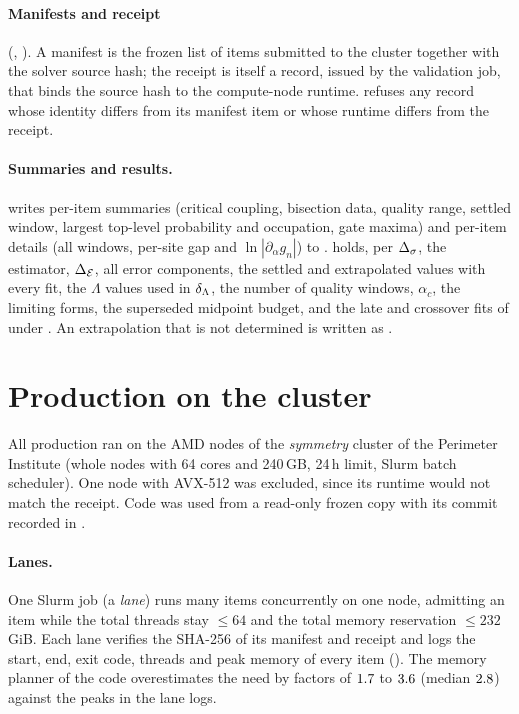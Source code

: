 \paragraph{Manifests and receipt} (, ). A manifest is the frozen list of items
submitted to the cluster together with the solver source hash; the receipt is itself a record, issued by the validation job, that
binds the source hash to the compute-node runtime.  refuses any record whose identity differs from its manifest
item or whose runtime differs from the receipt.

\paragraph{Summaries and results.}  writes per-item summaries (critical coupling, bisection data, quality range,
settled window, largest top-level probability and occupation, gate maxima) and per-item details (all windows, per-site gap and
$\ln|\partial_\alpha g_n|$) to .  holds, per $\Delta_\sigma$, the estimator, $\Delta_{\mathcal E}$,
all error components, the settled and extrapolated values with every fit, the $\Lambda$ values used in $\delta_\Lambda$, the number of quality
windows, $\alpha_c$, the limiting forms, the superseded midpoint budget, and the late and crossover fits of 
under . An extrapolation that is not determined is written as .

\section{Production on the cluster}\label{nrg:app:cluster}
All production ran on the AMD nodes of the \emph{symmetry} cluster of the Perimeter Institute (whole nodes with 64 cores and 240\,GB,
24\,h limit, Slurm batch scheduler). One node with AVX-512 was excluded, since its runtime would not match the receipt. Code was used
from a read-only frozen copy with its commit recorded in .

\paragraph{Lanes.} One Slurm job (a \emph{lane}) runs many items concurrently on one node, admitting an item while the total threads
stay $\le64$ and the total memory reservation $\le232$\,GiB. Each lane verifies the SHA-256 of its manifest and receipt and logs the
start, end, exit code, threads and peak memory of every item (). The memory planner of the code overestimates
the need by factors of $1.7$ to $3.6$ (median $2.8$) against the peaks in the lane logs.

